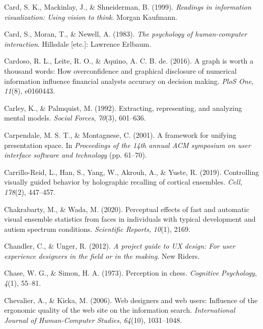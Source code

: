 \documentclass[print]{nuthesis}
\newlength{\cslhangindent}
\newenvironment{CSLReferences}[2]%
{\setlength{\parindent}{0pt}%
\everypar{\setlength{\hangindent}{\cslhangindent}}\ignorespaces}%
{\par}
\begin{document}
\begin{CSLReferences}{1}{0}
\leavevmode{}%
Card, S. K., Mackinlay, J., \& Shneiderman, B. (1999). \emph{Readings in information visualization: Using vision to think}. Morgan Kaufmann.

\leavevmode{}%
Card, S., Moran, T., \& Newell, A. (1983). \emph{The psychology of human-computer interaction}. Hillsdale {[}etc.{]}: Lawrence Erlbaum.

\leavevmode{}%
Cardoso, R. L., Leite, R. O., \& Aquino, A. C. B. de. (2016). A graph is worth a thousand words: How overconfidence and graphical disclosure of numerical information influence financial analysts accuracy on decision making. \emph{PloS One}, \emph{11}(8), e0160443.

\leavevmode{}%
Carley, K., \& Palmquist, M. (1992). Extracting, representing, and analyzing mental models. \emph{Social Forces}, \emph{70}(3), 601--636.

\leavevmode{}%
Carpendale, M. S. T., \& Montagnese, C. (2001). A framework for unifying presentation space. In \emph{Proceedings of the 14th annual ACM symposium on user interface software and technology} (pp. 61--70).

\leavevmode{}%
Carrillo-Reid, L., Han, S., Yang, W., Akrouh, A., \& Yuste, R. (2019). Controlling visually guided behavior by holographic recalling of cortical ensembles. \emph{Cell}, \emph{178}(2), 447--457.

\leavevmode{}%
Chakrabarty, M., \& Wada, M. (2020). Perceptual effects of fast and automatic visual ensemble statistics from faces in individuals with typical development and autism spectrum conditions. \emph{Scientific Reports}, \emph{10}(1), 2169.

\leavevmode{}%
Chandler, C., \& Unger, R. (2012). \emph{A project guide to UX design: For user experience designers in the field or in the making}. New Riders.

\leavevmode{}%
Chase, W. G., \& Simon, H. A. (1973). Perception in chess. \emph{Cognitive Psychology}, \emph{4}(1), 55--81.

\leavevmode{}%
Chevalier, A., \& Kicka, M. (2006). Web designers and web users: Influence of the ergonomic quality of the web site on the information search. \emph{International Journal of Human-Computer Studies}, \emph{64}(10), 1031--1048.


\end{CSLReferences}
\end{document}
